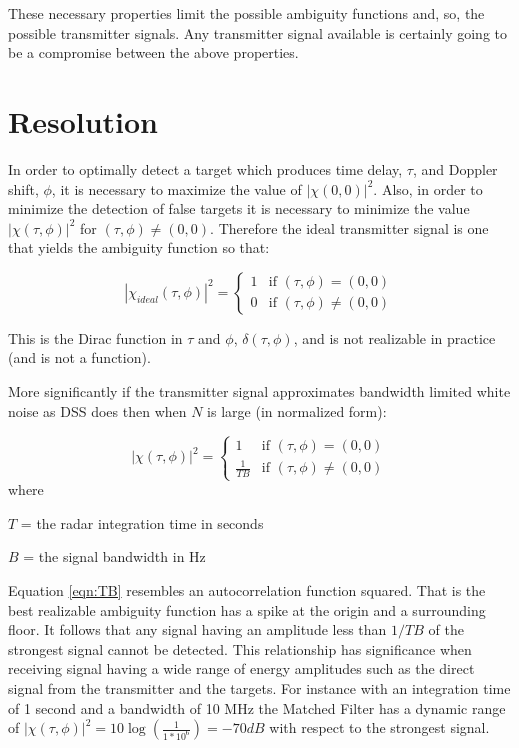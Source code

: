\documentclass[a4paper]{report}
\numberwithin{equation}{chapter}
\begin{document}
These necessary properties limit the possible ambiguity functions and, so, the possible transmitter signals. Any transmitter signal available is certainly going to be a compromise between the above properties.

\section[Resolution]{Resolution}
\label{sec:Resolution}

In order to optimally detect a target which produces time delay, $\tau$, and Doppler shift, $\phi$, it is necessary to maximize the value of $|\chi(0, 0)|^2$. Also, in order to minimize the detection of false targets it is necessary to minimize the value $|\chi(\tau, \phi)|^2$ for $(\tau, \phi) \ne (0, 0)$. Therefore the ideal transmitter signal is one that yields the ambiguity function so that:

\begin{equation}
|\chi_{ideal}(\tau, \phi)|^2 = 
\begin{cases}
1 & \text{if } (\tau, \phi) = (0, 0)\\
0 & \text{if } (\tau, \phi) \ne (0, 0)
\end{cases}
\end{equation}

This is the Dirac function in $\tau$ and $\phi$, $\delta(\tau, \phi)$, and is not realizable in practice (and is not a function).

\bigskip

More significantly if the transmitter signal approximates bandwidth limited white noise as DSS does then when $N$ is large (in normalized form):

\begin{equation}
|\chi(\tau, \phi)|^2 =
\begin{cases}
1 & \text{if } (\tau, \phi) = (0,0)\\
\frac{1}{TB} & \text{if } (\tau, \phi) \ne (0, 0)
\end{cases}
\label{eqn:TB}
\end{equation}
where

$T$ = the radar integration time in seconds

$B$ = the signal bandwidth in Hz

\bigskip

Equation \ref{eqn:TB} resembles an autocorrelation function squared. That is the best realizable ambiguity function has a spike at the origin and a surrounding floor. It follows that any signal having an amplitude less than $1/TB$ of the strongest signal cannot be detected. This relationship has significance when receiving signal having a wide range of energy amplitudes such as the direct signal from the transmitter and the targets. For instance with an integration time of 1 second and a bandwidth of 10 MHz the Matched Filter has a dynamic range of 
\begin{math}
|\chi(\tau, \phi)|^2 = 10 \log{\left(\frac{1}{1 * 10^6}\right)} = -70dB
\end{math}
with respect to the strongest signal.
\end{document}
